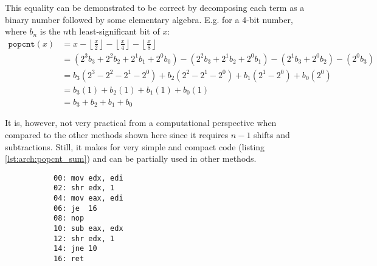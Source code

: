 This equality can be demonstrated to be correct by decomposing each term as a
binary number followed by some elementary algebra\footnotemark.  E.g. for a
4-bit number, where $b_n$ is the $n\text{th}$ least-significant bit of $x$:
\begin{align*}
    \texttt{popcnt}(x)
        &= x
            - \left\lfloor \frac{x}{2} \right\rfloor
            - \left\lfloor \frac{x}{4} \right\rfloor
            - \left\lfloor \frac{x}{8} \right\rfloor \\
        &= (2^3b_3+2^2b_2+2^1b_1+2^0b_0)
            - (2^2b_3+2^1b_2+2^0b_1)
            - (2^1b_3+2^0b_2)
            - (2^0b_3) \\
        &= b_3(2^3-2^2-2^1-2^0) + b_2(2^2-2^1-2^0) + b_1(2^1-2^0) + b_0(2^0) \\
        &= b_3(1) + b_2(1) + b_1(1) + b_0(1) \\
        &= b_3 + b_2 + b_1 + b_0
\end{align*}


It is, however, not very practical from a computational perspective when
compared to the other methods shown here since it requires $n - 1$ shifts and
subtractions.  Still, it makes for very simple and compact code (listing
\ref{lst:arch:popcnt_sum}) and can be partially used in other methods.

\begin{figure}[ht]
    \vspace{-\baselineskip}
    \begin{subfigure}[t]{0.65\textwidth}
        
    \end{subfigure}
    \hspace*{\fill}
    \begin{subfigure}[t]{0.3\textwidth}
        \begin{lstlisting}[style=x86]
00: mov edx, edi
02: shr edx, 1
04: mov eax, edi
06: je  16
08: nop
10: sub eax, edx
12: shr edx, 1
14: jne 10
16: ret
        \end{lstlisting}
    \end{subfigure}
    \vspace{-\baselineskip}
\end{figure}

